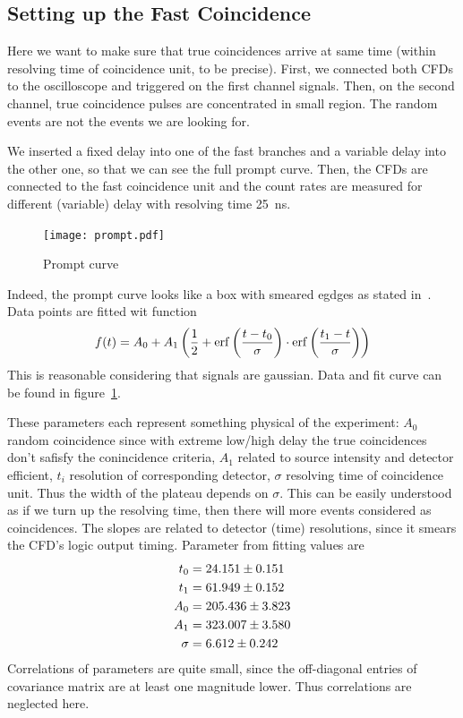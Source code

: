 \subsection{Setting up the Fast Coincidence}
Here we want to make sure that true coincidences arrive at same time (within resolving time of coincidence unit, to be precise). First, we connected both CFDs to the oscilloscope and triggered on the first channel signals. Then, on the second channel, true coincidence pulses are concentrated in small region. The random events are not the events we are looking for. 

We inserted a fixed delay into one of the fast branches and a variable delay into the other one, so that we can see the full prompt curve. Then, the CFDs are connected to the fast coincidence unit and the count rates are measured for different (variable) delay with resolving time \SI{25}{\nano\s}. 

\begin{figure}[H]
   \centering
   \texttt{[image: prompt.pdf]}
   \caption{Prompt curve}%
   \label{fig:prompt}
\end{figure}
Indeed, the prompt curve looks like a box with smeared egdges as stated in~\cite{descr}. Data points are fitted wit function
\begin{equation}
   f(t) = A_0 + A_1 \left( \frac{1}{2} + \erf \left(\frac{t-t_0}{\sigma} \right) \cdot \erf \left(\frac{t_1 - t}{\sigma} \right) \right)
\end{equation}
This is reasonable considering that signals are gaussian. Data and fit curve can be found in figure~\ref{fig:prompt}.

These parameters each represent something physical of the experiment: $A_0$ random coincidence since with extreme low/high delay the true coincidences don't safisfy the conincidence criteria, $A_1$ related to source intensity and detector efficient, $t_i$ resolution of corresponding detector, $\sigma$ resolving time of coincidence unit. Thus the width of the plateau depends on $\sigma$. This can be easily understood as if we turn up the resolving time, then there will more events considered as coincidences. The slopes are related to detector (time) resolutions, since it smears the CFD's logic output timing. Parameter from fitting values are
\begin{align*}
   t_0 &= \num{24.151 +- 0.151} \\
   t_1 &=  \num{61.949 +- 0.152} \\
   A_0 &= \num{205.436 +- 3.823} \\
   A_1 &= \num{323.007 +- 3.580} \\
   \sigma &= \num{6.612 +- 0.242}
\end{align*}
Correlations of parameters are quite small, since the off-diagonal entries of covariance matrix are at least one magnitude lower. Thus correlations are neglected here.

